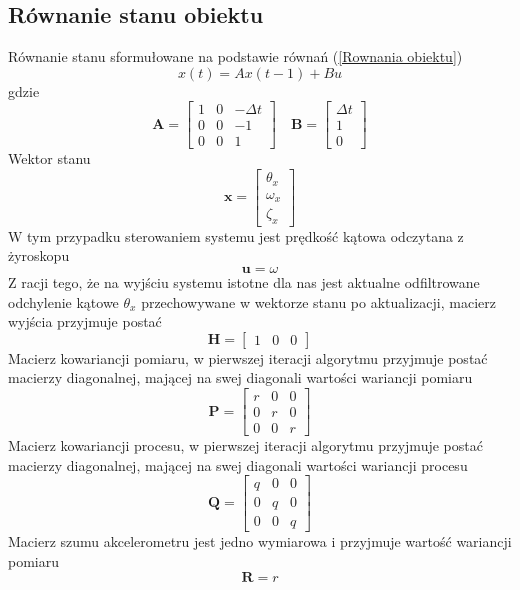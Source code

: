 \subsection{Równanie stanu obiektu}
Równanie stanu sformułowane na podstawie równań (\ref{Rownania obiektu})
$$
    x(t) = Ax(t-1) + Bu
$$
gdzie
$$
    \mathbf{A} =
    \left[
    \begin{array}{ccc}
        1 & 0 & -\Delta t \\
        0 & 0 & -1 \\
        0 & 0 & 1
    \end{array}
    \right]
    \quad
    \mathbf{B} = 
    \left[
    \begin{array}{c}
        \Delta t \\
        1 \\
        0
    \end{array}
    \right]
$$
%
Wektor stanu
$$
    \mathbf{x} = 
    \left[
    \begin{array}{c}
        \theta_x \\
        \omega_x \\
        \zeta_x
    \end{array}
    \right]
$$
%
W tym przypadku sterowaniem systemu jest prędkość kątowa odczytana z żyroskopu
$$
    \mathbf{u} = \omega
$$
%
Z racji tego, że na wyjściu systemu istotne dla nas jest aktualne odfiltrowane odchylenie kątowe $\theta_x$ przechowywane w wektorze stanu po aktualizacji, macierz wyjścia przyjmuje postać
$$
    \mathbf{H} = 
    \left[
    \begin{array}{ccc}
        1 & 0 & 0
    \end{array}
    \right]
$$
%
Macierz kowariancji pomiaru, w pierwszej iteracji algorytmu przyjmuje postać macierzy diagonalnej, mającej na swej diagonali wartości wariancji pomiaru
$$
    \mathbf{P} = 
    \left[
    \begin{array}{ccc}
        r & 0 & 0 \\
        0 & r & 0 \\
        0 & 0 & r
    \end{array}
    \right]
$$
%
Macierz kowariancji procesu, w pierwszej iteracji algorytmu przyjmuje postać macierzy diagonalnej, mającej na swej diagonali wartości wariancji procesu
$$
    \mathbf{Q} = 
    \left[
    \begin{array}{ccc}
        q & 0 & 0 \\
        0 & q & 0 \\
        0 & 0 & q
    \end{array}
    \right]
$$
%
Macierz szumu akcelerometru jest jedno wymiarowa i przyjmuje wartość wariancji pomiaru
$$
    \mathbf{R} = r
$$

